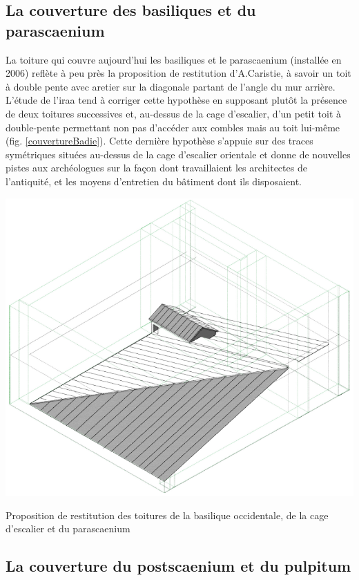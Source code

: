 	\subsection{La couverture des \glspl{basilique} et du \gls{parascaenium}}
	\label{couverture-basi}
		
		La toiture qui couvre aujourd'hui les \glspl{basilique} et le \gls{parascaenium} (installée en 2006) reflète à peu près la proposition de restitution d'A.Caristie, à savoir un toit à double pente avec \gls{aretier} sur la diagonale partant de l'angle du mur arrière. L'étude de l'\gls{iraa} \cite[p. 36]{orangeTxt} tend à corriger cette hypothèse en supposant plutôt la présence de deux toitures successives et, au-dessus de la cage d’escalier, d’un petit toit à double-pente permettant non pas d’accéder aux combles mais au toit lui-même (fig. \ref{couvertureBadie}). Cette dernière hypothèse s'appuie sur des traces symétriques situées au-dessus de la cage d’escalier orientale et donne de nouvelles pistes aux archéologues sur la façon dont travaillaient les architectes de l'antiquité, et les moyens d'entretien du bâtiment dont ils disposaient. 
		
		\begin{figureth}
			\includegraphics[width=0.7\linewidth]{images/couvertureBadie}
			\caption[Toitures de basiliques par A.Badie]{Proposition de restitution des toitures de la \gls{basilique} occidentale, de la cage d'escalier et du \gls{parascaenium} \footnotemark}
			\label{couvertureBadie}
		\end{figureth}	
		
		\subsection{La couverture du \gls{postscaenium} et du \gls{pulpitum}} \label{couverture}
		
